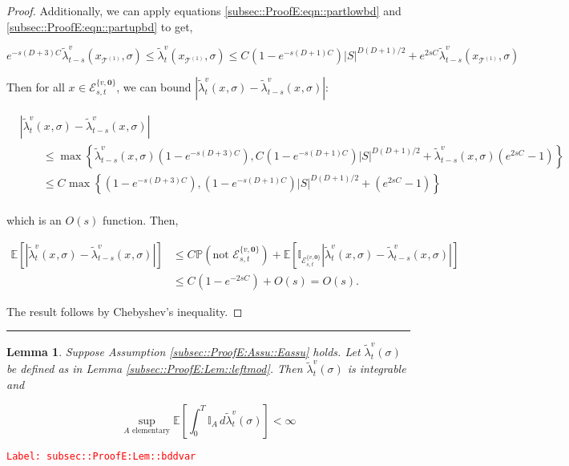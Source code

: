 \documentclass[12pt]{article}
\newcommand{\mb}{\mathbb}
\newcommand{\mc}{\mathcal}
\newcommand{\te}{\text}
\newcommand{\tr}{\textcolor{red}}
\newcommand{\labe}[1]{\tr{\texttt{Label: #1}}}
\newcommand{\lin}{\rule{\linewidth}{0.4 pt}}
\newcommand{\pr}{\mb{P}}							%
\newcommand{\ex}[1]{\mb{E}\left[#1\right]}			%
\renewcommand{\root}{\mathbf{0}}				%
\renewcommand{\v}{v}							%
\renewcommand{\S}{S}							%
\newcommand{\s}{\sigma}							%
\newcommand{\T}{T}								%
\newcommand{\x}{x}								%
\renewcommand{\t}{t}							%
\renewcommand{\tt}{s}							%
\newcommand{\vind}[1]{^{#1}}					%
\newcommand{\cind}[1]{_{#1}}					%
\newcommand{\tip}[1]{#1}						%
\newcommand{\ts}[1]{_{#1}}						%
\newcommand{\const}{C}							%
\newcommand{\degr}{D}							%
\newcommand{\tree}{\mc{T}}						%
\newcommand{\sln}[1]{^{(#1)}}					%
\newcommand{\alt}[1]{\widetilde{#1}}			%
\newcommand{\indx}[1]{_{#1}}					%
\newcommand{\evnt}{\mc{E}}						%
\newcommand{\typset}{A}							%
\newcommand{\crate}{\alt{\lambda}}				%
\newtheorem{lem}[thms]{Lemma}
\begin{document}
\begin{proof}
Additionally, we can apply equations \eqref{subsec::ProofE:eqn::partlowbd} and  \eqref{subsec::ProofE:eqn::partupbd} to get,

\[e^{-\tt(\degr+3)\const\indx{}}\crate\vind{\v}\ts{\t-\tt}(\x\cind{\tree\sln{1}}\tip{},\s) \leq \crate\vind{\v}\ts{\t}(\x\cind{\tree\sln{1}}\tip{},\s) \leq \const\indx{}(1 - e^{-\tt(\degr+1)\const\indx{}})|\S|^{\degr(\degr+1)/2} + e^{2\tt\const\indx{}}\crate\vind{\v}\ts{\t-\tt}(\x\cind{\tree\sln{1}}\tip{},\s)\]

Then for all \(\x\cind{}\tip{} \in \evnt^{\{\v,\root\}}_{\tt,\t}\), we can bound \(|\crate\vind{\v}\ts{\t}(\x\cind{}\tip{},\s) - \crate\vind{\v}\ts{\t-\tt}(\x\cind{}\tip{},\s)|\):

\begin{align*}
&|\crate\vind{\v}\ts{\t}(\x\cind{}\tip{},\s) - \crate\vind{\v}\ts{\t-\tt}(\x\cind{}\tip{},\s)| \\
&\hspace{24pt}\leq \max\left\{\crate\vind{\v}\ts{\t-\tt}(\x\cind{}\tip{},\s)\left(1 - e^{-\tt(\degr+3)\const\indx{}}\right),\const\indx{}(1-e^{-\tt(\degr+1)\const\indx{}})|\S|^{\degr(\degr+1)/2} + \crate\vind{\v}\ts{\t-\tt}(\x\cind{}\tip{},\s)\left(e^{2\tt\const\indx{}} - 1\right)\right\}\\
&\hspace{24pt}\leq \const\indx{}\max\left\{\left(1 - e^{-\tt(\degr+3)\const\indx{}}\right),(1-e^{-\tt(\degr+1)\const\indx{}})|\S|^{\degr(\degr+1)/2} + \left(e^{2\tt\const\indx{}} - 1\right)\right\}\\
\end{align*}

which is an \(O(\tt)\) function. Then,

\begin{align*}
\ex{|\crate\vind{\v}\ts{\t}(\x\cind{}\tip{},\s) - \crate\vind{\v}\ts{\t-\tt}(\x\cind{}\tip{},\s)|} &\leq \const\indx{}\pr\left(\te{not }\evnt^{\{\v,\root\}}_{\tt,\t}\right) + \ex{\mb{I}_{\evnt^{\{\v,\root\}}_{\tt,\t}}|\crate\vind{\v}\ts{\t}(\x\cind{}\tip{},\s) - \crate\vind{\v}\ts{\t-\tt}(\x\cind{}\tip{},\s)|}\\
&\leq \const\indx{}(1 - e^{-2\tt\const\indx{}}) + O(\tt) = O(\tt).
\end{align*}

The result follows by Chebyshev's inequality.
\end{proof}

\lin

\begin{lem}
Suppose Assumption \ref{subsec::ProofE:Assu::Eassu} holds. Let \(\crate\vind{\v}\ts{\t}(\s)\) be defined as in Lemma \ref{subsec::ProofE:Lem::leftmod}. Then \(\crate\vind{\v}\ts{\t}(\s)\) is integrable and 

\[\sup_{\typset\te{ elementary}} \ex{\int_0^\T \mb{I}_\typset\,d\crate\vind{\v}\ts{\t}(\s)} < \infty\]
\label{subsec::ProofE:Lem::bddvar}
\end{lem}
\labe{subsec::ProofE:Lem::bddvar}
\end{document}
